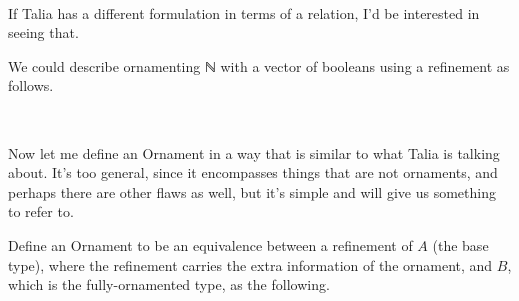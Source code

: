 \documentclass{article}
\begin{document}
\begin{code}%
\>[0]\AgdaSpace{}%
\AgdaSpace{}%
\AgdaSymbol{\{}\AgdaSpace{}%
\AgdaSpace{}%
\AgdaSymbol{:}\AgdaSpace{}%
\AgdaSymbol{\}}\AgdaSpace{}%
\AgdaSymbol{(}\AgdaSpace{}%
\AgdaSymbol{:}\AgdaSpace{}%
\AgdaSpace{}%
\AgdaSymbol{)}\AgdaSpace{}%
\AgdaSymbol{(}\AgdaSpace{}%
\AgdaSymbol{:}\AgdaSpace{}%
\AgdaSpace{}%
\AgdaSpace{}%
\AgdaSymbol{)}\AgdaSpace{}%
\AgdaSymbol{:}\AgdaSpace{}%
\AgdaSpace{}%
\AgdaSymbol{(}\AgdaSpace{}%
\AgdaSpace{}%
\AgdaSymbol{)}\AgdaSpace{}%
\<%
\\
\>[0][@{}l@{\AgdaIndent{0}}]%
\>[2]\AgdaSpace{}%
\AgdaSymbol{:}\AgdaSpace{}%
\AgdaSymbol{(}\AgdaSpace{}%
\AgdaSymbol{:}\AgdaSpace{}%
\AgdaSymbol{)}\AgdaSpace{}%
\AgdaSpace{}%
\AgdaSpace{}%
\AgdaSpace{}%
\AgdaSpace{}%
\AgdaSpace{}%
\AgdaSpace{}%
\<%
\end{code}

If Talia has a different formulation in terms of a relation, I'd be
interested in seeing that.

We could describe ornamenting ℕ with a vector of booleans using a
refinement as follows.

\begin{code}%
\>[0]\AgdaSpace{}%
\AgdaSymbol{:}\AgdaSpace{}%
\<%
\\
\>[0]\AgdaSpace{}%
\AgdaSymbol{=}\AgdaSpace{}%
\AgdaSpace{}%
\AgdaSpace{}%
\AgdaSymbol{(}\AgdaSpace{}%
\AgdaSymbol{)}\<%
\end{code}

Now let me define an Ornament in a way that is similar to what Talia
is talking about. It's too general, since it encompasses things that
are not ornaments, and perhaps there are other flaws as well, but it's
simple and will give us something to refer to.

Define an Ornament to be an equivalence between a refinement of $A$
(the base type), where the refinement carries the extra information of
the ornament, and $B$, which is the fully-ornamented type, as the
following.
\end{document}
